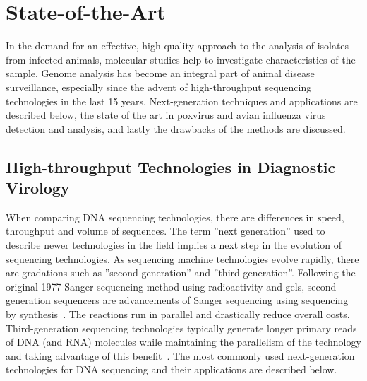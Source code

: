 \chapter{State-of-the-Art}\label{chap:state-art}
In the demand for an effective, high-quality approach to the analysis of isolates from infected animals, molecular studies help to investigate characteristics of the sample. Genome analysis has become an integral part of animal disease surveillance, especially since the advent of high-throughput sequencing technologies in the last 15 years. Next-generation techniques and applications are described below, the state of the art in poxvirus and avian influenza virus detection and analysis, and lastly the drawbacks of the methods are discussed.

\section{High-throughput Technologies in Diagnostic Virology}

When comparing DNA sequencing technologies, there are differences in speed, throughput and volume of sequences. The term ''next generation'' used to describe newer technologies in the field implies a next step in the evolution of sequencing technologies. As sequencing machine technologies evolve rapidly, there are gradations such as ''second generation'' and ''third generation''. Following the original 1977 Sanger sequencing method using radioactivity and gels, second generation sequencers are advancements of Sanger sequencing using sequencing by synthesis~\cite{mardis2008next}. The reactions run in parallel and drastically reduce overall costs. Third-generation sequencing technologies typically generate longer primary reads of DNA (and RNA) molecules while maintaining the parallelism of the technology and taking advantage of this benefit~\cite{slatko2018overview}. The most commonly used next-generation technologies for DNA sequencing and their applications are described below.

